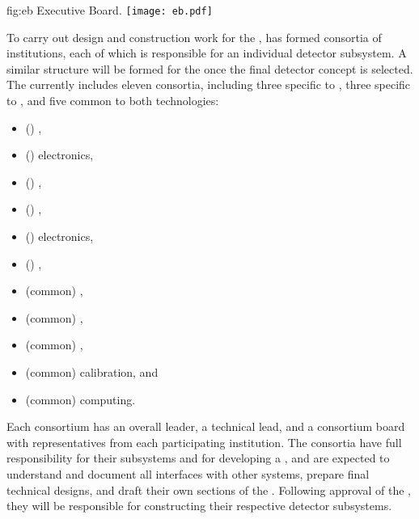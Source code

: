 \begin{dunefigure}	
{fig:eb}{ Executive Board.}
\texttt{[image: eb.pdf]}
\end{dunefigure}


To carry out design and construction work for the  ,  has  formed consortia of institutions, each of which is responsible for an individual detector subsystem. A similar structure will be formed for the  once the final detector concept is selected. The  currently includes eleven consortia, including three specific to , three specific to , and five common to both technologies:
\begin{itemize}
\item (\single) , %
\item (\single)  electronics, %
\item (\single) , %
\item (\dual) , %
\item (\dual)  electronics, %
\item (\dual) , %
\item (common) , %
\item (common) ,  %
\item (common) , %
\item (common) calibration,  and %
\item (common) computing.
\end{itemize} 
 Each consortium has an overall leader, a technical lead, and a consortium board with representatives from each participating institution. The consortia have full responsibility for their subsystems and for developing a , and are expected to understand and document all interfaces with other systems, prepare final technical designs, and draft their own sections of the . Following approval of the  , they will be responsible for constructing their respective detector subsystems. %

